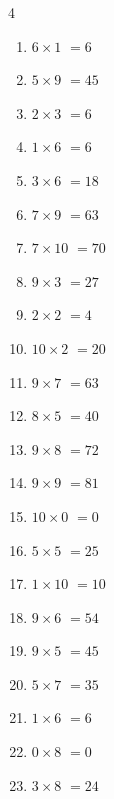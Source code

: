 \begin{multicols}{4}
\begin{enumerate}
  \item $6\times 1$
        $=6$

  \item $5\times 9$
        $=45$

  \item $2\times 3$
        $=6$

  \item $1\times 6$
        $=6$

  \item $3\times 6$
        $=18$

  \item $7\times 9$
        $=63$

  \item $7\times 10$
        $=70$

  \item $9\times 3$
        $=27$

  \item $2\times 2$
        $=4$

  \item $10\times 2$
        $=20$

  \item $9\times 7$
        $=63$

  \item $8\times 5$
        $=40$

  \item $9\times 8$
        $=72$

  \item $9\times 9$
        $=81$

  \item $10\times 0$
        $=0$

  \item $5\times 5$
        $=25$

  \item $1\times 10$
        $=10$

  \item $9\times 6$
        $=54$

  \item $9\times 5$
        $=45$

  \item $5\times 7$
        $=35$

  \item $1\times 6$
        $=6$

  \item $0\times 8$
        $=0$

  \item $3\times 8$
        $=24$


\end{enumerate}
\end{multicols}
